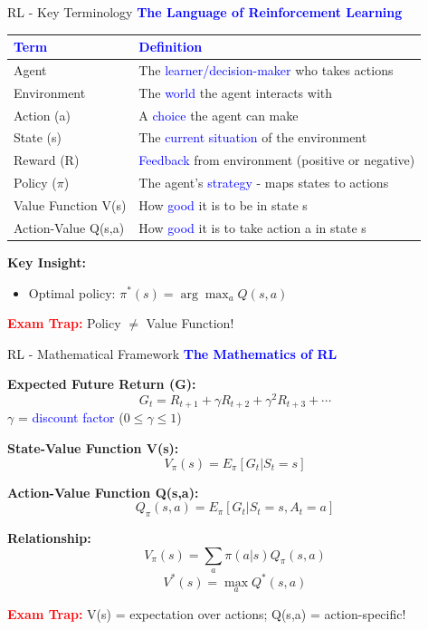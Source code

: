 \documentclass[8pt]{beamer}
\begin{document}
\begin{frame}{RL - Key Terminology}
\fontsize{6.5}{7.5}\selectfont
\textcolor{blue}{\textbf{The Language of Reinforcement Learning}}

\begin{tabular}{|p{2.5cm}|p{5.5cm}|}
\hline
\textcolor{blue}{Term} & \textcolor{blue}{Definition} \\
\hline
Agent & The \textcolor{blue}{learner/decision-maker} who takes actions \\
\hline
Environment & The \textcolor{blue}{world} the agent interacts with \\
\hline
Action (a) & A \textcolor{blue}{choice} the agent can make \\
\hline
State (s) & The \textcolor{blue}{current situation} of the environment \\
\hline
Reward (R) & \textcolor{blue}{Feedback} from environment (positive or negative) \\
\hline
Policy ($\pi$) & The agent's \textcolor{blue}{strategy} - maps states to actions \\
\hline
Value Function V(s) & How \textcolor{blue}{good} it is to be in state s \\
\hline
Action-Value Q(s,a) & How \textcolor{blue}{good} it is to take action a in state s \\
\hline
\end{tabular}

\textbf{Key Insight:}
\begin{itemize}
\item Optimal policy: $\pi^*(s) = \arg\max_a Q(s,a)$
\end{itemize}

\textcolor{red}{\textbf{Exam Trap:}} Policy $\neq$ Value Function!
\end{frame}

\begin{frame}{RL - Mathematical Framework}
\fontsize{6.5}{7.5}\selectfont
\textcolor{blue}{\textbf{The Mathematics of RL}}

\textbf{Expected Future Return (G):}
\[
G_t = R_{t+1} + \gamma R_{t+2} + \gamma^2 R_{t+3} + \cdots
\]
$\gamma$ = \textcolor{blue}{discount factor} ($0 \leq \gamma \leq 1$)

\textbf{State-Value Function V(s):}
\[
V_\pi(s) = E_\pi[G_t | S_t = s]
\]

\textbf{Action-Value Function Q(s,a):}
\[
Q_\pi(s,a) = E_\pi[G_t | S_t = s, A_t = a]
\]

\textbf{Relationship:}
\[
V_\pi(s) = \sum_a \pi(a|s) Q_\pi(s,a)
\]
\[
V^*(s) = \max_a Q^*(s,a)
\]

\textcolor{red}{\textbf{Exam Trap:}} V(s) = expectation over actions; Q(s,a) = action-specific!
\end{frame}
\end{document}
